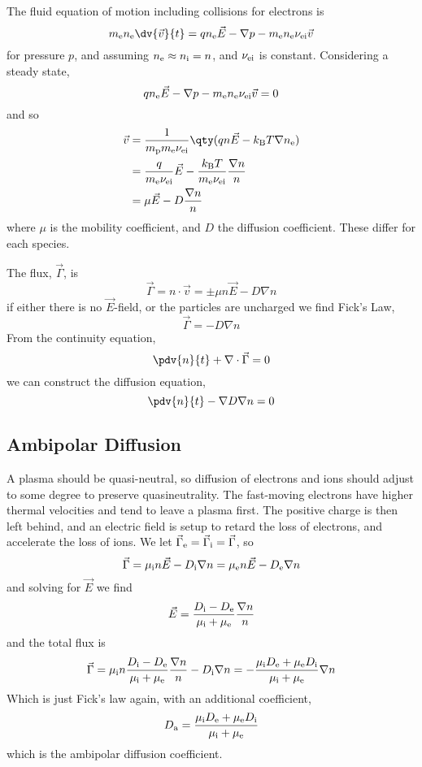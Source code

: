\documentclass{book}         		                %
\begin{document}
The fluid equation of motion including collisions for electrons is
\begin{equation}
  \label{eq:25}
  m_{\rm e} n_{\rm e} \dv{\vec{v}}{t} = q n_{\rm e} \vec{E} - \nabla p - m_{\rm e} n_{\rm e} \nu_{\rm ei} \vec{v}
\end{equation}
for pressure $p$, and assuming $n_{\rm e} \approx n_{\rm i} = n$, and
$\nu_{\rm ei}$ is constant. Considering a steady state,
\[ q n_{\rm e} \vec{E} - \nabla p - m_{\rm e} n_{\rm e} \nu_{\rm ei}
\vec{v} = 0 \]
and so
\begin{align*}
  \vec{v} &= \frac{1}{m_{\rm p} m_{\rm e} \nu_{\rm ei}} \qty( q n \vec{E} - k_{\rm B} T \nabla n_{\rm e} ) \\
&= \frac{q}{m_{\rm e} \nu_{\rm ei}} \vec{E} - \frac{k_{\rm B} T}{m_{\rm e} \nu_{\rm ei}} \frac{\nabla n}{n} \\
&= \mu \vec{E} - D \frac{\nabla n}{n}
\end{align*}
where $\mu$ is the mobility coefficient, and $D$ the diffusion
coefficient. These differ for each species.

The flux, $\vec{\Gamma}$, is
\[ \vec{\Gamma} = n \cdot \vec{v} = \pm \mu n\vec{E} - D \nabla n \]
if either there is no $\vec{E}$-field, or the particles are uncharged we find Fick's Law,
\begin{equation}
  \label{eq:26}
  \vec{\Gamma} = -D \nabla n
\end{equation}
From the continuity equation,
\[ \pdv{n}{t} + \nabla \cdot \vec{\Gamma} = 0 \]
we can construct the diffusion equation,
\begin{equation}
  \label{eq:27}
  \pdv{n}{t} - \nabla D \nabla n = 0
\end{equation}

\subsection{Ambipolar Diffusion}
\label{sec:ambipolar-diffusion}

A plasma should be quasi-neutral, so diffusion of electrons and ions
should adjust to some degree to preserve quasineutrality. The
fast-moving electrons have higher thermal velocities and tend to leave
a plasma first. The positive charge is then left behind, and an
electric field is setup to retard the loss of electrons, and
accelerate the loss of ions. We let $\vec{\Gamma}_{\rm e} =
\vec{\Gamma}_{\rm i} = \vec{\Gamma}$, so
\[ \vec{\Gamma} = \mu_{\rm i} n \vec{E} - D_{\rm i} \nabla n =
\mu_{\rm e} n \vec{E} - D_{\rm e} \nabla n \]
and solving for $\vec{E}$ we find
\[ \vec{E} = \frac{D_{\rm i} - D_{\rm e}}{\mu_{\rm i} + \mu_{\rm e}}
\frac{\nabla n}{n} \]
and the total flux is
\[ \vec{\Gamma} = \mu_{\rm i} n \frac{D_{\rm i} - D_{\rm e}}{\mu_{\rm
    i}+\mu_{\rm e}} \frac{\nabla n}{n} - D_{\rm i} \nabla n = -
\frac{\mu_{\rm i} D_{\rm e} + \mu_{\rm e} D_{\rm i}}{\mu_{\rm i} +
  \mu_{\rm e}} \nabla n \]
Which is just Fick's law again, with an additional coefficient,
\[ D_{\rm a} = \frac{\mu_{\rm i} D_{\rm e} + \mu_{\rm e}D_{\rm
    i}}{\mu_{\rm i} + \mu_{\rm e}} \] which is the ambipolar diffusion
coefficient.
\end{document}
